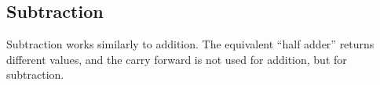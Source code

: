 


\subsection{Subtraction}

Subtraction works similarly to addition. The equivalent “half adder” returns different values, and the carry forward is not used for addition, but for subtraction.

